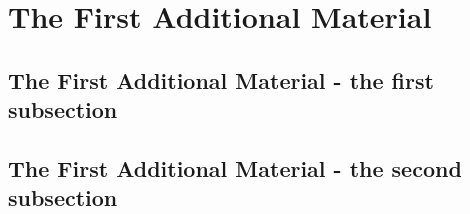 \chapter{The First Additional Material}
    \blindtext[10]
    \newpage
    \section{The First Additional Material - the first subsection}
        \blindtext[10] 
        \newpage
    \section{The First Additional Material - the second subsection}
        \blindtext[10] 
        \newpage